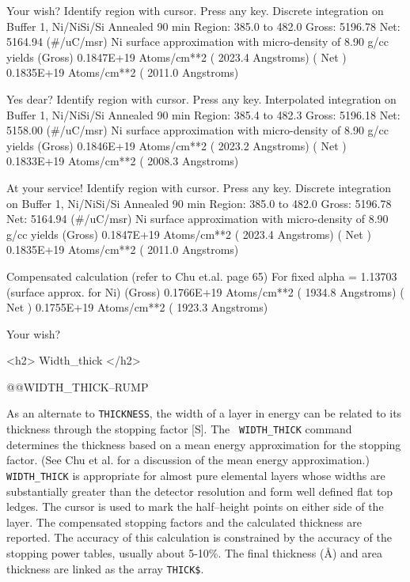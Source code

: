 {{{{{\medskip\beginscreen \beginverb

Your wish? 
Identify region with cursor.  Press any key.
     Discrete integration on Buffer  1,   Ni/NiSi/Si Annealed 90 min
 Region:  385.0 to  482.0 Gross:     5196.78 Net:     5164.94  (#/uC/msr)
 Ni surface approximation with micro-density of  8.90 g/cc yields
 (Gross)  0.1847E+19 Atoms/cm**2 ( 2023.4 Angstroms)
 ( Net )  0.1835E+19 Atoms/cm**2 ( 2011.0 Angstroms)

Yes dear? 
Identify region with cursor.  Press any key.
 Interpolated integration on Buffer  1,   Ni/NiSi/Si Annealed 90 min
 Region:  385.4 to  482.3 Gross:     5196.18 Net:     5158.00  (#/uC/msr)
 Ni surface approximation with micro-density of  8.90 g/cc yields
 (Gross)  0.1846E+19 Atoms/cm**2 ( 2023.2 Angstroms)
 ( Net )  0.1833E+19 Atoms/cm**2 ( 2008.3 Angstroms)

At your service! 
Identify region with cursor.  Press any key.
     Discrete integration on Buffer  1,   Ni/NiSi/Si Annealed 90 min
 Region:  385.0 to  482.0 Gross:     5196.78 Net:     5164.94  (#/uC/msr)
 Ni surface approximation with micro-density of  8.90 g/cc yields
 (Gross)  0.1847E+19 Atoms/cm**2 ( 2023.4 Angstroms)
 ( Net )  0.1835E+19 Atoms/cm**2 ( 2011.0 Angstroms)

Compensated calculation (refer to Chu et.al. page 65)
For fixed alpha =    1.13703      (surface approx. for Ni)
 (Gross)  0.1766E+19 Atoms/cm**2 ( 1934.8 Angstroms)
 ( Net )  0.1755E+19 Atoms/cm**2 ( 1923.3 Angstroms)

Your wish? 
\endverb \endscreen

<h2> Width\_thick </h2>


@@{WIDTH\_THICK--RUMP}

As an alternate to {\tt THICKNESS}, the width of a layer in energy can be
related to its thickness through the stopping factor [S].  The {\tt
WIDTH\_THICK} command determines the thickness based on a mean energy
approximation for the stopping factor.  (See Chu et al. for a discussion of
the mean energy approximation.)  {\tt WIDTH\_THICK} is appropriate for almost
pure elemental layers whose widths are substantially greater than the detector
resolution and form well defined flat top ledges.  The cursor is used to mark
the half--height points on either side of the layer.  The compensated stopping
factors and the calculated thickness are reported.  The accuracy of this 
calculation is constrained by the accuracy of the stopping power tables,
usually about 5-10\%.  The final thickness (\AA) and area thickness are linked
as the array {\tt THICK\$}.

}}}}}
